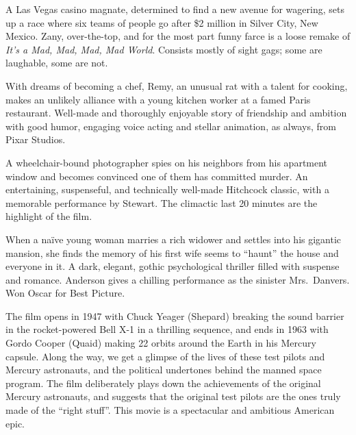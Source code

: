    A Las Vegas casino magnate, determined to find a new avenue for wagering, sets up a race where six teams of people go after \$2 million in Silver City, New Mexico. Zany, over-the-top, and for the most part funny farce is a loose remake of \textit{It's a Mad, Mad, Mad, Mad World}. Consists mostly of sight gags; some are laughable, some are not. \author{DW} 

   With dreams of becoming a chef, Remy, an unusual rat with a talent for cooking, makes an unlikely alliance with a young kitchen worker at a famed Paris restaurant. Well-made and thoroughly enjoyable story of friendship and ambition with good humor, engaging voice acting and stellar animation, as always, from Pixar Studios. \author{DW} 

   A wheelchair-bound photographer spies on his neighbors from his apartment window and becomes convinced one of them has committed murder. An entertaining, suspenseful, and technically well-made Hitchcock classic, with a memorable performance by Stewart. The climactic last 20 minutes are the highlight of the film. \author{DW} 

   When a na\"ive young woman marries a rich widower and settles into his gigantic mansion, she finds the memory of his first wife seems to ``haunt'' the house and everyone in it. A dark, elegant, gothic psychological thriller filled with suspense and romance. Anderson gives a chilling performance as the sinister Mrs.\ Danvers. Won Oscar for Best Picture. \author{DW}

\iffalse
\movie{Red Balloon, The}{1956}{34m}{\fourplus} \dir{Albert Lamorisse} \cast{Pascal Lamorisse; Sabine Lamorisse} \author{AW}
\fi

\iffalse
\movie{Repulsion}
\fi

   The film opens in 1947 with Chuck Yeager (Shepard) breaking the sound barrier in the rocket-powered Bell X-1 in a thrilling sequence, and ends in 1963 with Gordo Cooper (Quaid) making 22 orbits around the Earth in his Mercury capsule. Along the way, we get a glimpse of the lives of these test pilots and Mercury astronauts, and the political undertones behind the manned space program. The film deliberately plays down the achievements of the original Mercury astronauts, and suggests that the original test pilots are the ones truly made of the ``right stuff''. This movie is a spectacular and ambitious American epic. \author{AW} 


